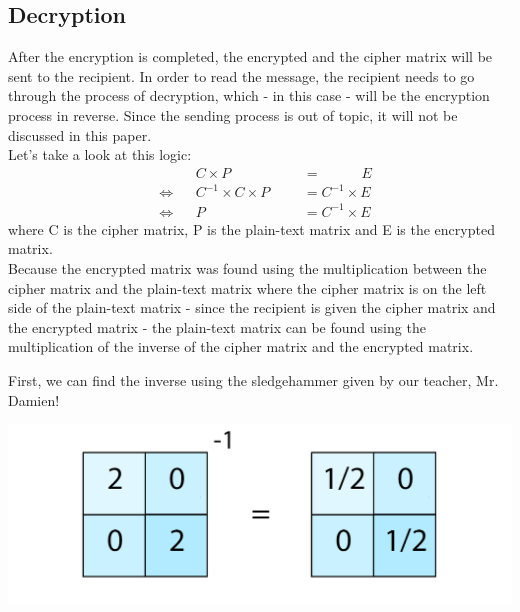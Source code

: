 \documentclass[11pt]{article}
\begin{document}
\begin{subs}
\subsection{Decryption}
After the encryption is completed, the encrypted and the cipher matrix will be sent to the recipient. In order to read the message, the recipient needs to go through the process of decryption, which - in this case - will be the encryption process in reverse. Since the sending process is out of topic, it will not be discussed in this paper.\vspace{5mm}\\
Let's take a look at this logic: 
	\begin{align*}
		& &&C \times P &&&= \phantom{xxxxx} E\\
		&\iff &&C^{-1} \times C \times P &&&= C^{-1} \times E\\
		&\iff &&P &&&= C^{-1} \times E
	\end{align*}
\phantom{x}\hspace{3mm}where C is the cipher matrix, P is the plain-text matrix and E is the encrypted matrix.\vspace{3mm}\\
Because the encrypted matrix was found using the multiplication between the cipher matrix and the plain-text matrix where the cipher matrix is on the left side of the plain-text matrix - since the recipient is given the cipher matrix and the encrypted matrix - the plain-text matrix can be found using the multiplication of the inverse of the cipher matrix and the encrypted matrix.\vspace{3mm}\\
\pagebreak

First, we can find the inverse using the sledgehammer given by our teacher, Mr. Damien!\\
\begin{center} \includegraphics[scale=0.2]{inverse_1} \end{center}\vspace{5mm}


\end{subs}
\end{document}
